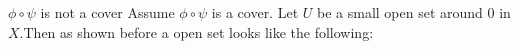 \documentclass[14pt]{beamer}
\begin{document}



\begin{frame}{$\phi\circ \psi$ is not a cover}
Assume $\phi\circ \psi$ is a cover. Let $U$ be a small open set around $0$ in $X$.\pause  Then as shown before a open set looks like the following:
\begin{center}
    


\begin{tikzpicture}[x=0.75pt,y=0.75pt,yscale=-1,xscale=1]


\end{tikzpicture}
\end{center}
\end{frame}
\end{document}

